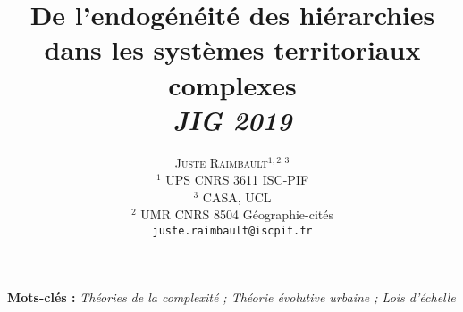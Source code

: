 \documentclass[11pt]{article}
\newcommand{\noun}[1]{\textsc{#1}}
\begin{document}
\title{\vspace{-1cm}De l'endogénéité des hiérarchies dans les systèmes territoriaux complexes
\\\medskip
\textit{JIG 2019}
}
\author{\noun{Juste Raimbault}$^{1,2,3}$\medskip\\
$^1$ UPS CNRS 3611 ISC-PIF\\
$^3$ CASA, UCL\\
$^2$ UMR CNRS 8504 G{\'e}ographie-cit{\'e}s\medskip\\
\texttt{juste.raimbault@iscpif.fr}
}
\date{}

\maketitle

\justify



\textbf{Mots-clés : }\textit{Théories de la complexité ; Théorie évolutive urbaine ; Lois d'échelle}

\medskip
\end{document}
